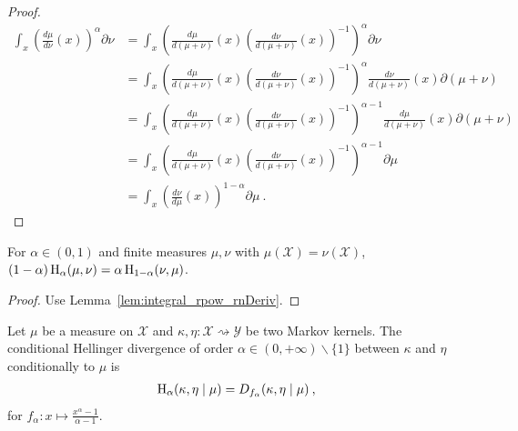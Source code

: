\begin{proof}\leanok
\uses{}
\begin{align*}
  \int_x \left(\frac{d \mu}{d \nu}(x)\right)^\alpha \partial \nu
  &= \int_x \left(\frac{d \mu}{d (\mu + \nu)}(x) \left(\frac{d \nu}{d (\mu + \nu)}(x)\right)^{-1} \right)^\alpha \partial \nu \\
  &= \int_x \left(\frac{d \mu}{d (\mu + \nu)}(x) \left(\frac{d \nu}{d (\mu + \nu)}(x)\right)^{-1} \right)^\alpha \frac{d \nu}{d (\mu + \nu)}(x) \partial (\mu + \nu) \\
  &= \int_x \left(\frac{d \mu}{d (\mu + \nu)}(x) \left(\frac{d \nu}{d (\mu + \nu)}(x)\right)^{-1} \right)^{\alpha - 1} \frac{d \mu}{d (\mu + \nu)}(x) \partial (\mu + \nu) \\
  &= \int_x \left(\frac{d \mu}{d (\mu + \nu)}(x) \left(\frac{d \nu}{d (\mu + \nu)}(x)\right)^{-1} \right)^{\alpha - 1} \partial \mu \\
  &= \int_x \left(\frac{d \nu}{d \mu}(x)\right)^{1 - \alpha} \partial \mu
  \: .
  \end{align*}
\end{proof}

\begin{lemma}
  \label{lem:hellingerAlpha_symm}
  \leanok
  For $\alpha \in (0, 1)$ and finite measures $\mu, \nu$ with $\mu(\mathcal X) = \nu(\mathcal X)$, $(1 - \alpha) \operatorname{H}_\alpha(\mu, \nu) = \alpha \operatorname{H}_{1 - \alpha}(\nu, \mu)$.
\end{lemma}

\begin{proof}\leanok
{}
Use Lemma~\ref{lem:integral_rpow_rnDeriv}.
\end{proof}


\begin{definition}
  \label{def:condHellingerAlpha}
  \leanok
  Let $\mu$ be a measure on $\mathcal X$ and $\kappa, \eta : \mathcal X \rightsquigarrow \mathcal Y$ be two Markov kernels. The conditional Hellinger divergence of order $\alpha \in (0,+\infty) \backslash \{1\}$ between $\kappa$ and $\eta$ conditionally to $\mu$ is
  \begin{align*}
  \operatorname{H}_\alpha(\kappa, \eta \mid \mu) = D_{f_\alpha}(\kappa, \eta \mid \mu) \: ,
  \end{align*}
  for $f_\alpha : x \mapsto \frac{x^{\alpha} - 1}{\alpha - 1}$.
\end{definition}


